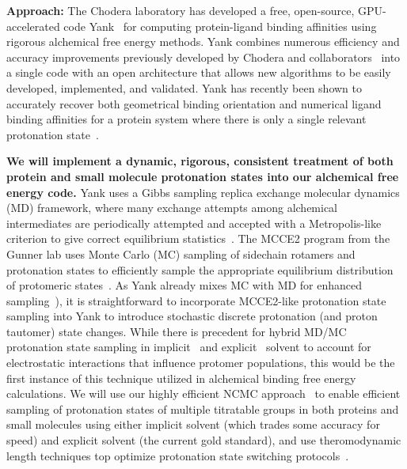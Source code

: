 \documentclass[11pt]{article}
\begin{document}
{\bf Approach:} The Chodera laboratory has developed a free, open-source, GPU-accelerated code {\sc Yank}~\cite{yank-url} for computing protein-ligand binding affinities using rigorous alchemical free energy methods.
{\sc Yank} combines numerous efficiency and accuracy improvements previously developed by Chodera and collaborators~\cite{mobley-chodera-dill:2006:jcp:orientation-restraints,mobley-chodera-dill:2007:jctc:confine-and-release,shirts-mobley-chodera-pande:2007:jpcb:dispersion-corrections,chodera:jcp:2007,shirts-chodera:jcp:2008:mbar,noe:jcp:2011:msm-review,ncmc,chodera-shirts:jcp:2011:gibbs} into a single code with an open architecture that allows new algorithms to be easily developed, implemented, and validated.
{\sc Yank} has recently been shown to accurately recover both geometrical binding orientation and numerical ligand binding affinities for a protein system where there is only a single relevant protonation state~\cite{chodera-shirts:jcamd:2013:yank}.

{\bf We will implement a dynamic, rigorous, consistent treatment of both protein and small molecule protonation states into our alchemical free energy code.}
{\sc Yank} uses a Gibbs sampling replica exchange molecular dynamics (MD) framework, where many exchange attempts among alchemical intermediates are periodically attempted and accepted with a Metropolis-like criterion to give correct equilibrium statistics~\cite{chodera-shirts:jcp:2011:gibbs,chodera-shirts:jcamd:2013:yank}.  
The MCCE2 program from the Gunner lab uses Monte Carlo (MC) sampling of sidechain rotamers and protonation states to efficiently sample the appropriate equilibrium distribution of protomeric states~\cite{gunner:bba:2000:proton-electron-transfer,gunner:j-comput-chem:2009:mcce2}.
As {\sc Yank} already mixes MC with MD for enhanced sampling~\cite{chodera-shirts:jcamd:2013:yank}), it is straightforward to incorporate MCCE2-like protonation state sampling into {\sc Yank} to introduce stochastic discrete protonation (and proton tautomer) state changes.
While there is precedent for hybrid MD/MC protonation state sampling in implicit~\cite{gunner:biophys-j:1997:mcce,gunner:biophys-j:2002:mcce,mongan:2004:j-comput-chem:constant-pH,gunner:j-comput-chem:2009:mcce2} and explicit~\cite{stern:jcp:2007:constant-pH,roux:jctc:2015:constant-pH-ncmc} solvent to account for electrostatic interactions that influence protomer populations, this would be the first instance of this technique utilized in alchemical binding free energy calculations.
We will use our highly efficient NCMC approach~\cite{ncmc} to enable efficient sampling of protonation states of multiple titratable groups in both proteins and small molecules using either implicit solvent (which trades some accuracy for speed) and explicit solvent (the current gold standard), and use theromodynamic length techniques top optimize protonation state switching protocols~\cite{crooks:2007:prl:thermodynamic-length,minh-chodera:2011:jcp:mis-estimator,shenfeld-xu-eastwood-dror-shaw:2009:pre:optimizing-thermodynamic-length}.
\end{document}
